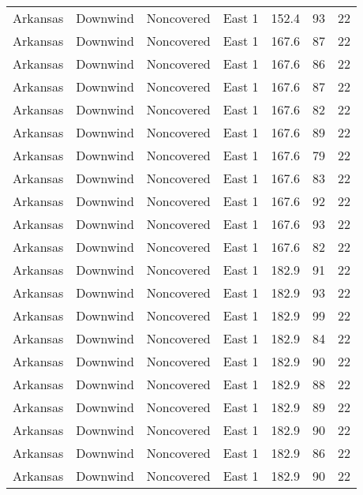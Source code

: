 \documentclass{article}
\begin{document}
\begin{longtable}[H]{ccccccc}
Arkansas & Downwind  & Noncovered & East 1        & 152.4        & 93          & 22  \\
Arkansas & Downwind  & Noncovered & East 1        & 167.6        & 87          & 22  \\
Arkansas & Downwind  & Noncovered & East 1        & 167.6        & 86          & 22  \\
Arkansas & Downwind  & Noncovered & East 1        & 167.6        & 87          & 22  \\
Arkansas & Downwind  & Noncovered & East 1        & 167.6        & 82          & 22  \\
Arkansas & Downwind  & Noncovered & East 1        & 167.6        & 89          & 22  \\
Arkansas & Downwind  & Noncovered & East 1        & 167.6        & 79          & 22  \\
Arkansas & Downwind  & Noncovered & East 1        & 167.6        & 83          & 22  \\
Arkansas & Downwind  & Noncovered & East 1        & 167.6        & 92          & 22  \\
Arkansas & Downwind  & Noncovered & East 1        & 167.6        & 93          & 22  \\
Arkansas & Downwind  & Noncovered & East 1        & 167.6        & 82          & 22  \\
Arkansas & Downwind  & Noncovered & East 1        & 182.9        & 91          & 22  \\
Arkansas & Downwind  & Noncovered & East 1        & 182.9        & 93          & 22  \\
Arkansas & Downwind  & Noncovered & East 1        & 182.9        & 99          & 22  \\
Arkansas & Downwind  & Noncovered & East 1        & 182.9        & 84          & 22  \\
Arkansas & Downwind  & Noncovered & East 1        & 182.9        & 90          & 22  \\
Arkansas & Downwind  & Noncovered & East 1        & 182.9        & 88          & 22  \\
Arkansas & Downwind  & Noncovered & East 1        & 182.9        & 89          & 22  \\
Arkansas & Downwind  & Noncovered & East 1        & 182.9        & 90          & 22  \\
Arkansas & Downwind  & Noncovered & East 1        & 182.9        & 86          & 22  \\
Arkansas & Downwind  & Noncovered & East 1        & 182.9        & 90          & 22  \\

\end{longtable}
\end{document}
